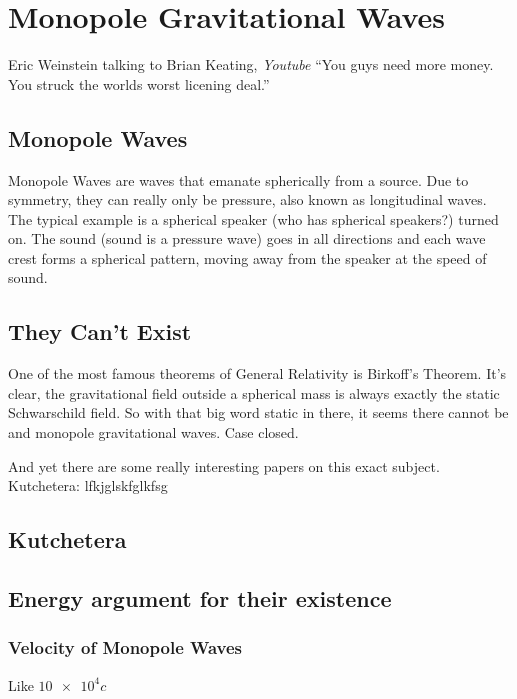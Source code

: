 \documentclass[../rzero]{subfiles}
\begin{document}
\chapter{Monopole Gravitational Waves}\label{monopoleGravitationalWavesChapter}

\begin{chapquote}{Eric Weinstein talking to Brian Keating, \textit{Youtube\cite{drbriankeatingEricWeinsteinTheoretical2020}}}
``You guys need more money. You struck the worlds worst licening deal.''
\end{chapquote}

\section{Monopole Waves}
Monopole Waves are waves that emanate spherically from a source. Due to symmetry, they can really only be pressure, also known as longitudinal waves. The typical example is a spherical speaker (who has spherical speakers?) turned on. The sound (sound is a pressure wave) goes in all directions and each wave crest forms a spherical pattern, moving away from the speaker at the speed of sound. 

\section{They Can't Exist}
One of the most famous theorems of General Relativity is Birkoff's Theorem\cite{Birkhoff1923}. It's clear, the gravitational field outside a spherical mass is always exactly the static Schwarschild field. So with that big word static in there, it seems there cannot be and monopole gravitational waves. Case closed. 

And yet there are some really interesting papers on this exact subject. Kutchetera: lfkjglskfglkfsg

\section{Kutchetera}

\section{Energy argument for their existence}

\subsection{Velocity of Monopole Waves}
	Like $\num{10e4} c$ 
\end{document}
